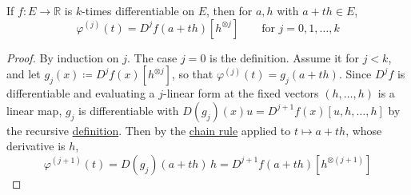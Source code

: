   \begin{lemma}
    \label{thm:derivatives-along-a-line}
    If $f: E \to \mathbb{R}$ is $k$-times differentiable on $E$, then for $a, h$ with $a + th \in E$, 
    \begin{equation}
      \varphi^{(j)}(t) = D^j f(a + th) [h^{\otimes j}] \qquad \text{for } j = 0, 1, \ldots, k
    \end{equation}
  \end{lemma}
  \begin{proof}
    By induction on $j$. The case $j = 0$ is the definition. Assume it for $j < k$, and let $g_j (x) \coloneqq D^j f(x) [h^{\otimes j}]$, so that $\varphi^{(j)}(t) = g_j(a + th)$. Since $D^j f$ is differentiable and evaluating a $j$-linear form at the fixed vectors $(h, \ldots, h)$ is a linear map, $g_j$ is differentiable with $D(g_j)(x) u = D^{j+1} f(x) [u, h, \ldots, h]$ by the recursive \hyperref[def:kth-frechet-derivative]{definition}. Then by the \hyperref[thm:chain-rule]{chain rule} applied to $t \mapsto a + th$, whose derivative is $h$, 
    \begin{equation}
      \varphi^{(j+1)}(t) = D(g_j)(a + th) \, h = D^{j+1} f(a + th) [h^{\otimes (j+1)}]
    \end{equation}
  \end{proof}

